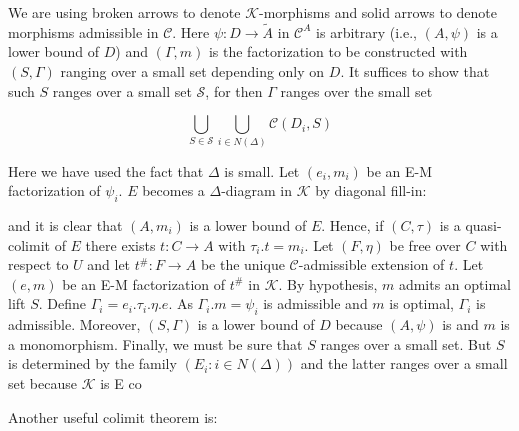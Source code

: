 We are using broken arrows to denote $\mathcal{K}$-morphisms and solid arrows to denote morphisms admissible in $\mathcal{C}$. Here $\psi: D \longrightarrow \tilde{A}$ in $\mathcal{C}^A$ is arbitrary (i.e., $(A, \psi)$ is a lower bound of $D$) and $(\Gamma, m)$ is the factorization to be constructed with $(S, \Gamma)$ ranging over a small set depending only on $D$. It suffices to show that such $S$ ranges over a small set $\mathcal{S}$, for then $\Gamma$ ranges over the small set

$$\bigcup_{S \in \mathcal{S}} \bigcup_{i \in N(\Delta)} \mathcal{C}(D_i, S)$$

Here we have used the fact that $\Delta$ is small. Let $(e_i, m_i)$ be an E-M factorization of $\psi_i$. $E$ becomes a $\Delta$-diagram in $\mathcal{K}$ by diagonal fill-in:

and it is clear that $(A, m_i)$ is a lower bound of $E$. Hence, if $(C, \tau)$ is a quasi-colimit of $E$ there exists $t: C \longrightarrow A$ with $\tau_i.t = m_i$. Let $(F, \eta)$ be free over $C$ with respect to $U$ and let $t^{\#}: F \longrightarrow A$ be the unique $\mathcal{C}$-admissible extension of $t$. Let $(e, m)$ be an E-M factorization of $t^{\#}$ in $\mathcal{K}$. By hypothesis, $m$ admits an optimal lift $S$. Define $\Gamma_i = e_i.\tau_i.\eta.e$. As $\Gamma_i.m = \psi_i$ is admissible and $m$ is optimal, $\Gamma_i$ is admissible. Moreover, $(S, \Gamma)$ is a lower bound of $D$ because $(A, \psi)$ is and $m$ is a monomorphism. Finally, we must be sure that $S$ ranges over a small set. But $S$ is determined by the family $(E_i: i \in N(\Delta))$ and the latter ranges over a small set because $\mathcal{K}$ is E co

Another useful colimit theorem is: